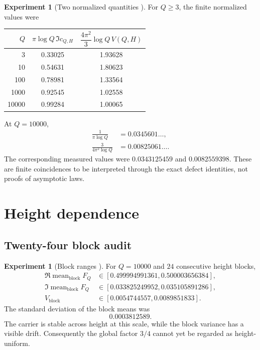 \documentclass[11pt]{amsart}
\numberwithin{equation}{section}
\theoremstyle{plain}
\theoremstyle{definition}
\newtheorem{experiment}[theorem]{Experiment}
\theoremstyle{remark}
\newcommand{\1}{\mathbf{1}}
\begin{document}
\begin{experiment}[Two normalized quantities {\normalfont[Numerical]}]
\label{exp:numerical_normalized_quantities}
For $Q\geq3$, the finite normalized values were
\begin{center}
\begin{tabular}{rcc}
\toprule
$Q$ & $\pi\log Q\,\Im c_{Q,H}$ &
$\dfrac{4\pi^2}{3}\log Q\,V(Q,H)$\\
\midrule
3 & 0.33025 & 1.93628\\
10 & 0.54631 & 1.80623\\
100 & 0.78981 & 1.33564\\
1000 & 0.92545 & 1.02558\\
10000 & 0.99284 & 1.00065\\
\bottomrule
\end{tabular}
\end{center}
At $Q=10000$,
\begin{align}
\frac1{\pi\log Q}
&=0.0345601\ldots,
\label{eq:numerical_imag_prediction}
\\
\frac3{4\pi^2\log Q}
&=0.00825061\ldots.
\label{eq:numerical_variance_prediction}
\end{align}
The corresponding measured values were
$0.0343125459$ and $0.0082559398$.  These are finite coincidences to be
interpreted through the exact defect identities, not proofs of asymptotic
laws.
\end{experiment}

\section{Height dependence}
\label{sec:numerical_height_dependence}

\subsection{Twenty-four block audit}
\label{subsec:numerical_block_audit}

\begin{experiment}[Block ranges {\normalfont[Numerical]}]
\label{exp:numerical_block_ranges}
For $Q=10000$ and $24$ consecutive height blocks,
\begin{align}
\Re\operatorname{mean}_{\mathrm{block}}F_Q
&\in[0.499994991361,0.500003656384],
\label{eq:numerical_block_real_range_detailed}
\\
\Im\operatorname{mean}_{\mathrm{block}}F_Q
&\in[0.033825249952,0.035105891286],
\label{eq:numerical_block_imag_range_detailed}
\\
V_{\mathrm{block}}
&\in[0.0054744557,0.0089851833].
\label{eq:numerical_block_var_range_detailed}
\end{align}
The standard deviation of the block means was
\begin{equation}
0.0003812589.
\label{eq:numerical_block_mean_std}
\end{equation}
The carrier is stable across height at this scale, while the block variance
has a visible drift.  Consequently the global factor $3/4$ cannot yet be
regarded as height-uniform.
\end{experiment}
\end{document}
